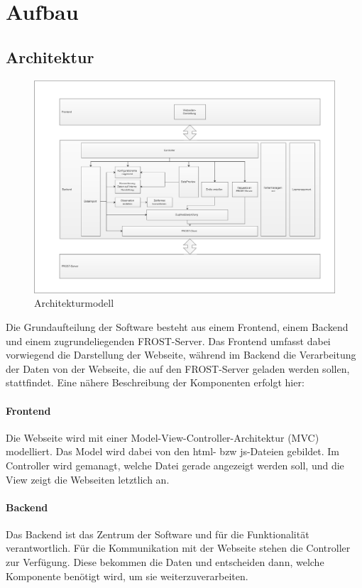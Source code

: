 \section{Aufbau}

\subsection{Architektur}
\begin{figure}[htbp]
\centering
\includegraphics[scale=0.44]{uml/architektur.eps}
\caption{\label{fig:architektur} Architekturmodell}
\end{figure}

Die Grundaufteilung der Software besteht aus einem Frontend, einem Backend und einem zugrundeliegenden FROST-Server. Das Frontend umfasst dabei vorwiegend die Darstellung der Webseite, während im Backend die Verarbeitung der Daten von der Webseite, die auf den FROST-Server geladen werden sollen, stattfindet. Eine nähere Beschreibung der Komponenten erfolgt hier:

\paragraph{Frontend}
Die Webseite wird mit einer Model-View-Controller-Architektur (MVC) modelliert.
Das Model wird dabei von den html- bzw js-Dateien gebildet.
Im Controller wird gemanagt, welche Datei gerade angezeigt werden soll, und die View zeigt die Webseiten letztlich an.

\paragraph{Backend}
Das Backend ist das Zentrum der Software und für die Funktionalität verantwortlich.
Für die Kommunikation mit der Webseite stehen die Controller zur Verfügung.
Diese bekommen die Daten und entscheiden dann, welche Komponente benötigt wird, um sie weiterzuverarbeiten.\\

